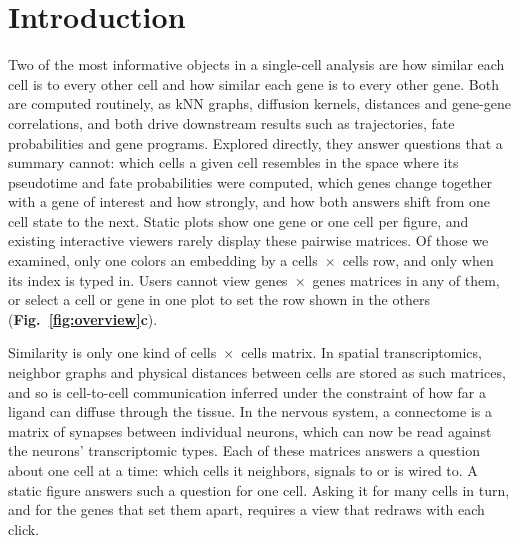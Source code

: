 \section{Introduction}



Two of the most informative objects in a single-cell analysis are how similar each cell is to every other cell and how similar each gene is to every other gene. Both are computed routinely, as kNN graphs, diffusion kernels, distances and gene-gene correlations, and both drive downstream results such as trajectories, fate probabilities and gene programs. Explored directly, they answer questions that a summary cannot: which cells a given cell resembles in the space where its pseudotime and fate probabilities were computed, which genes change together with a gene of interest and how strongly, and how both answers shift from one cell state to the next. Static plots show one gene or one cell per figure, and existing interactive viewers rarely display these pairwise matrices. Of those we examined, only one colors an embedding by a cells~$\times$~cells row, and only when its index is typed in. Users cannot view genes~$\times$~genes matrices in any of them, or select a cell or gene in one plot to set the row shown in the others (\textbf{Fig.~\ref{fig:overview}c}).

Similarity is only one kind of cells~$\times$~cells matrix. In spatial transcriptomics, neighbor graphs and physical distances between cells are stored as such matrices\cite{palla2022squidpy}, and so is cell-to-cell communication inferred under the constraint of how far a ligand can diffuse through the tissue\cite{cang2023commot}. In the nervous system, a connectome is a matrix of synapses between individual neurons, which can now be read against the neurons' transcriptomic types\cite{microns2025,gamlin2025}. Each of these matrices answers a question about one cell at a time: which cells it neighbors, signals to or is wired to. A static figure answers such a question for one cell. Asking it for many cells in turn, and for the genes that set them apart, requires a view that redraws with each click.


